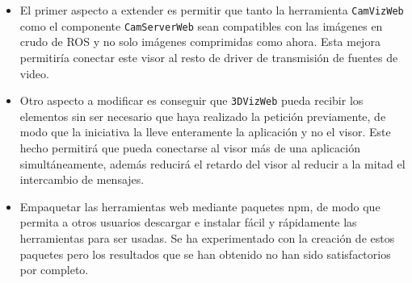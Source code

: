 \begin{itemize}
\item El primer aspecto a extender es permitir que tanto la herramienta \texttt{CamVizWeb} como el componente \texttt{CamServerWeb} sean compatibles con las imágenes en crudo de ROS y no solo imágenes comprimidas como ahora. Esta mejora permitiría conectar este visor al resto de driver de transmisión de fuentes de video.
\item Otro aspecto a modificar es conseguir que \texttt{3DVizWeb} pueda recibir los elementos sin ser necesario que haya realizado la petición previamente, de modo que la iniciativa la lleve enteramente la aplicación y no el visor. Este hecho permitirá que pueda conectarse al visor más de una aplicación simultáneamente, además reducirá el retardo del visor al reducir a la mitad el intercambio de mensajes.
\item Empaquetar las herramientas web mediante paquetes npm, de modo que permita a otros usuarios descargar e instalar fácil y rápidamente las herramientas para ser usadas. Se ha experimentado con la creación de estos paquetes pero los resultados que se han obtenido no han sido satisfactorios por completo.
\end{itemize}


